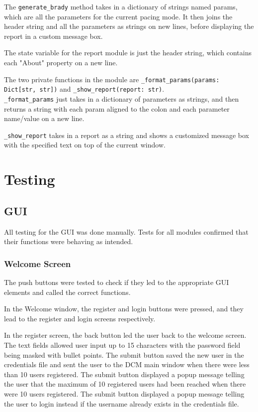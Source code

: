 \documentclass[12pt]{article}
\begin{document}
The \verb|generate_brady| method takes in a dictionary of strings named params, which are all the parameters for the current pacing mode.
It then joins the header string and all the parameters as strings on new lines, before displaying the report in a custom message box.

The state variable for the report module is just the header string, which contains each "About" property on a new line.

The two private functions in the module are \verb|_format_params(params: Dict[str, str])| and \verb|_show_report(report: str)|. \\
\verb|_format_params| just takes in a dictionary of parameters as strings, and then returns a string with each param aligned to the colon and each parameter name/value on a new line.

\verb|_show_report| takes in a report as a string and shows a customized message box with the specified text on top of the current window.

\newpage
\section{Testing}
\subsection{GUI}
All testing for the GUI was done manually. Tests for all modules confirmed that their functions were behaving as intended.

\subsubsection{Welcome Screen}\label{Testing:WelcomeScreen}
The push buttons were tested to check if they led to the appropriate GUI elements and called the correct functions.

In the Welcome window, the register and login buttons were pressed, and they lead to the register and login screens respectively.

In the register screen, the back button led the user back to the welcome screen. The text fields allowed user input up to 15 characters with the password field being masked with bullet points. The submit button saved the new user in the credentials file and sent the user to the DCM main window when there were less than 10 users registered. The submit button displayed a popup message telling the user that the maximum of 10 registered users had been reached when there were 10 users registered. The submit button displayed a popup message telling the user to login instead if the username already exists in the credentials file.
\end{document}
